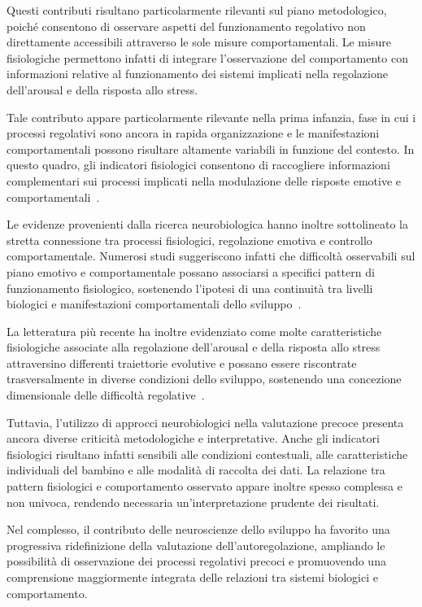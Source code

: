            Questi contributi risultano particolarmente rilevanti sul piano metodologico, poiché consentono di osservare aspetti del funzionamento regolativo non direttamente accessibili attraverso le sole misure comportamentali. Le misure fisiologiche permettono infatti di integrare l'osservazione del comportamento con informazioni relative al funzionamento dei sistemi implicati nella regolazione dell'arousal e della risposta allo stress.

            Tale contributo appare particolarmente rilevante nella prima infanzia, fase in cui i processi regolativi sono ancora in rapida organizzazione e le manifestazioni comportamentali possono risultare altamente variabili in funzione del contesto. In questo quadro, gli indicatori fisiologici consentono di raccogliere informazioni complementari sui processi implicati nella modulazione delle risposte emotive e comportamentali~\cite{calkins2007}.

            Le evidenze provenienti dalla ricerca neurobiologica hanno inoltre sottolineato la stretta connessione tra processi fisiologici, regolazione emotiva e controllo comportamentale. Numerosi studi suggeriscono infatti che difficoltà osservabili sul piano emotivo e comportamentale possano associarsi a specifici pattern di funzionamento fisiologico, sostenendo l'ipotesi di una continuità tra livelli biologici e manifestazioni comportamentali dello sviluppo~\cite{beauchaine2015,blair2022}.

            La letteratura più recente ha inoltre evidenziato come molte caratteristiche fisiologiche associate alla regolazione dell'arousal e della risposta allo stress attraversino differenti traiettorie evolutive e possano essere riscontrate trasversalmente in diverse condizioni dello sviluppo, sostenendo una concezione dimensionale delle difficoltà regolative~\cite{astle2022,beauchaine2019}.

            Tuttavia, l'utilizzo di approcci neurobiologici nella valutazione precoce presenta ancora diverse criticità metodologiche e interpretative. Anche gli indicatori fisiologici risultano infatti sensibili alle condizioni contestuali, alle caratteristiche individuali del bambino e alle modalità di raccolta dei dati. La relazione tra pattern fisiologici e comportamento osservato appare inoltre spesso complessa e non univoca, rendendo necessaria un'interpretazione prudente dei risultati.

            Nel complesso, il contributo delle neuroscienze dello sviluppo ha favorito una progressiva ridefinizione della valutazione dell'autoregolazione, ampliando le possibilità di osservazione dei processi regolativi precoci e promuovendo una comprensione maggiormente integrata delle relazioni tra sistemi biologici e comportamento.

